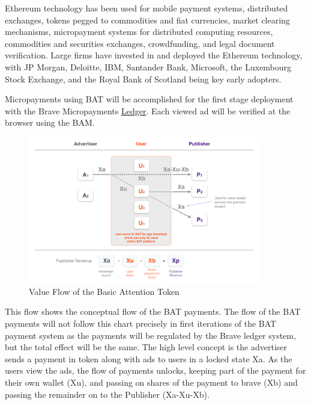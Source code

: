 \documentclass[11pt]{article}
\begin{document}
Ethereum technology has been used for mobile payment systems, distributed exchanges, tokens pegged to commodities and fiat currencies, market clearing mechanisms, micropayment systems for distributed computing resources, commodities and securities exchanges, crowdfunding, and legal document verification. Large firms have invested in and deployed the Ethereum technology, with JP Morgan, Deloitte, IBM, Santander Bank, Microsoft, the Luxembourg Stock Exchange, and the Royal Bank of Scotland being key early adopters.

Micropayments using BAT will be accomplished for the first stage deployment with the Brave Micropayments \href{https://github.com/brave/ledger}{Ledger}. Each viewed ad will be verified at the browser using the BAM. 


\begin{figure}
\begin{center}
\includegraphics[width=0.9\textwidth]{BAT_tokentech_diagram.png}
\caption{Value Flow of the Basic Attention Token}
\end{center}
\end{figure}



This flow shows the conceptual flow of the BAT payments. The flow of the BAT payments will not follow this chart precisely in first iterations of the BAT payment system as the payments will be regulated by the Brave ledger system, but the total effect will be the same. The high level concept is the advertiser sends a payment in token along with ads to users in a locked state Xa. As the users view the ads, the flow of payments unlocks, keeping part of the payment for their own wallet (Xu), and passing on shares of the payment to brave (Xb) and passing the remainder on to the Publisher (Xa-Xu-Xb).  
\end{document}
